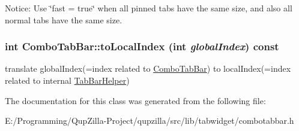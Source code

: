 Notice: Use \char`\"{}fast = true\char`\"{} when all pinned tabs have the same size, and also all normal tabs have the same size. 

\hypertarget{class_combo_tab_bar_ac37381dc0f5d788b9d21508fecec6013}{
\subsubsection[{toLocalIndex}]{\setlength{\rightskip}{0pt plus 5cm}int ComboTabBar::toLocalIndex (int {\em globalIndex}) const}}
\label{class_combo_tab_bar_ac37381dc0f5d788b9d21508fecec6013}


translate globalIndex(=index related to \hyperlink{class_combo_tab_bar}{ComboTabBar}) to localIndex(=index related to internal \hyperlink{class_tab_bar_helper}{TabBarHelper}) 



The documentation for this class was generated from the following file:\begin{DoxyCompactItemize}
\item 
E:/Programming/QupZilla-\/Project/qupzilla/src/lib/tabwidget/combotabbar.h\end{DoxyCompactItemize}
